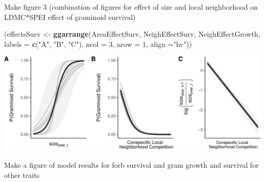 \documentclass[
]{article}
\newenvironment{Shaded}{\begin{snugshade}}{\end{snugshade}}
\newcommand{\DataTypeTok}[1]{\textcolor[rgb]{0.13,0.29,0.53}{#1}}
\newcommand{\DecValTok}[1]{\textcolor[rgb]{0.00,0.00,0.81}{#1}}
\newcommand{\KeywordTok}[1]{\textcolor[rgb]{0.13,0.29,0.53}{\textbf{#1}}}
\newcommand{\NormalTok}[1]{#1}
\newcommand{\StringTok}[1]{\textcolor[rgb]{0.31,0.60,0.02}{#1}}
\begin{document}
Make figure 3 (combination of figures for effect of size and local
neighborhood on LDMC*SPEI effect of graminoid survival)

\begin{Shaded}
\begin{Highlighting}[]
\NormalTok{(effectsSurv \textless{}{-}}\StringTok{ }\KeywordTok{ggarrange}\NormalTok{(AreaEffectSurv, NeighEffectSurv, NeighEffectGrowth,}
          \DataTypeTok{labels =} \KeywordTok{c}\NormalTok{(}\StringTok{"A"}\NormalTok{, }\StringTok{"B"}\NormalTok{, }\StringTok{"C"}\NormalTok{),}
          \DataTypeTok{ncol =} \DecValTok{3}\NormalTok{, }\DataTypeTok{nrow =} \DecValTok{1}\NormalTok{, }\DataTypeTok{align =}\StringTok{"hv"}\NormalTok{))}
\end{Highlighting}
\end{Shaded}

\includegraphics{figures/survEffectPlots-1.pdf}

Make a figure of model results for forb survival and gram growth and
survival for other traits
\end{document}
